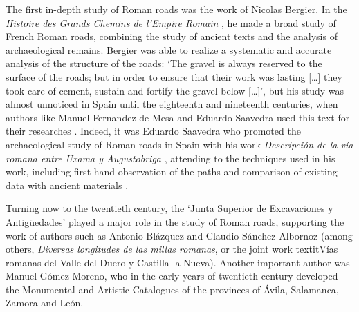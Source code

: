 	The first in-depth study of Roman roads was the work of Nicolas Bergier. In the \textit{Histoire des Grands Chemins de l’Empire Romain} \parencite{Bergier_1622}, he made a broad study of French Roman roads, combining the study of ancient texts and the analysis of archaeological remains. Bergier was able to realize a systematic and accurate analysis of the structure of the roads: ‘The gravel is always reserved to the surface of the roads; but in order to ensure that their work was lasting [\ldots] they took care of cement, sustain and fortify the gravel below [\ldots]’, but his study was almost unnoticed in Spain until the eighteenth and nineteenth centuries, when authors like Manuel Fernandez de Mesa and Eduardo Saavedra used this text for their researches \parencite[129--130]{Rodriguez_2010}. Indeed, it was Eduardo Saavedra who promoted the archaeological study of Roman roads in Spain with his work \textit{Descripción de la vía romana entre Uxama y Augustobriga} \parencite{Saavedra_1861}, attending to the techniques used in his work, including first hand observation of the paths and comparison of existing data with ancient materials \parencites[7]{Abásolo_1990}[199]{Arias_2002}.
	
	Turning now to the twentieth century, the ‘Junta Superior de Excavaciones y Antigüedades’ played a major role in the study of Roman roads, supporting the work of authors such as Antonio Blázquez and Claudio Sánchez Albornoz (among others, \textit{Diversas longitudes de las millas romanas}, or the joint work textit{Vías romanas del Valle del Duero y Castilla la Nueva}). Another important author was Manuel Gómez-Moreno, who in the early years of twentieth century developed the Monumental and Artistic Catalogues of the provinces of Ávila, Salamanca, Zamora and León.
	
